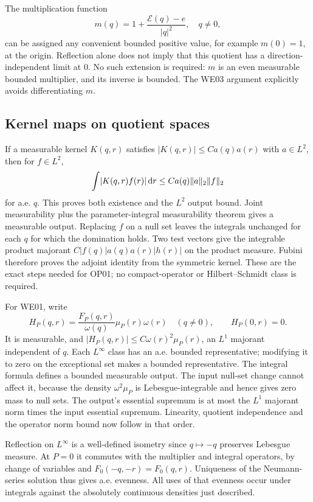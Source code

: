 \documentclass[11pt,a4paper]{article}
\theoremstyle{remark}\newtheorem{remark}[theorem]{Remark}
\newcommand{\abs}[1]{\lvert #1\rvert}\newcommand{\rankone}[2]{\lvert #1\rangle\langle #2\rvert}
\newcommand{\dd}{\,\mathrm d}\newcommand{\almosteverywhere}{\text{a.e.}}
\newcommand{\Ecal}{\mathcal E}
\begin{document}
The multiplication function
\[
 m(q)=1+\frac{\Ecal(q)-e}{\abs q^2},\quad q\ne0,
\]
can be assigned any convenient bounded positive value, for example $m(0)=1$, at the origin. Reflection alone does not imply that this quotient has a direction-independent limit at $0$. No such extension is required: $m$ is an even measurable bounded multiplier, and its inverse is bounded. The WE03 argument explicitly avoids differentiating $m$.

\subsection{Kernel maps on quotient spaces}
If a measurable kernel $K(q,r)$ satisfies $\abs{K(q,r)}\leq C a(q)a(r)$ with $a\in L^2$, then for $f\in L^2$,
\[
 \int\abs{K(q,r)f(r)}\dd r
 \leq C a(q)\norm a_2\norm f_2
\]
for a.e. $q$. This proves both existence and the $L^2$ output bound. Joint measurability plus the parameter-integral measurability theorem gives a measurable output. Replacing $f$ on a null set leaves the integrals unchanged for each $q$ for which the domination holds. Two test vectors give the integrable product majorant
$C\abs{f(q)}a(q)a(r)\abs{h(r)}$ on the product measure. Fubini therefore proves the adjoint identity from the symmetric kernel. These are the exact steps needed for OP01; no compact-operator or Hilbert--Schmidt class is required.

For WE01, write
\[
 H_P(q,r)=\frac{F_P(q,r)}{\omega(q)}\mu_P(r)\omega(r)
 \quad(q\ne0),\qquad H_P(0,r)=0.
\]
It is measurable, and $\abs{H_P(q,r)}\leq C\omega(r)^2\mu_P(r)$, an $L^1$ majorant independent of $q$. Each $L^\infty$ class has an a.e. bounded representative; modifying it to zero on the exceptional set makes a bounded representative. The integral formula defines a bounded measurable output. The input null-set change cannot affect it, because the density $\omega^2\mu_P$ is Lebesgue-integrable and hence gives zero mass to null sets. The output's essential supremum is at most the $L^1$ majorant norm times the input essential supremum. Linearity, quotient independence and the operator norm bound now follow in that order.

Reflection on $L^\infty$ is a well-defined isometry since $q\mapsto-q$ preserves Lebesgue measure. At $P=0$ it commutes with the multiplier and integral operators, by change of variables and $F_0(-q,-r)=F_0(q,r)$. Uniqueness of the Neumann-series solution thus gives a.e. evenness. All uses of that evenness occur under integrals against the absolutely continuous densities just described.
\end{document}
